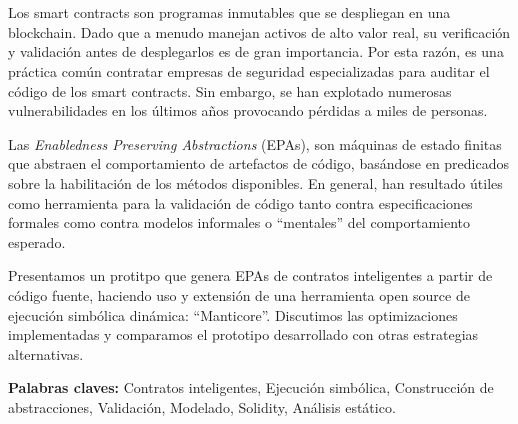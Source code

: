 \chapter*{\runtitulo}

\noindent Los smart contracts son programas inmutables que se despliegan en una blockchain.
Dado que a menudo manejan activos de alto valor real, su verificación y validación antes de desplegarlos es de gran importancia.
Por esta razón, es una práctica común contratar empresas de seguridad especializadas para auditar el código de los smart contracts.
Sin embargo, se han explotado numerosas vulnerabilidades en los últimos años provocando pérdidas a miles de personas.

Las \textit{Enabledness Preserving Abstractions} (EPAs), son máquinas de estado finitas que abstraen el comportamiento de artefactos de código, basándose en predicados sobre la habilitación de los métodos disponibles.
En general, han resultado útiles como herramienta para la validación de código tanto contra especificaciones formales como contra modelos informales o ``mentales'' del comportamiento esperado.

Presentamos un protitpo que genera EPAs de contratos inteligentes a partir de código fuente, haciendo uso y extensión de una herramienta open source de ejecución simbólica dinámica: ``Manticore''.
Discutimos las optimizaciones implementadas y comparamos el prototipo desarrollado con otras estrategias alternativas.

\bigskip

\noindent\textbf{Palabras claves:}  Contratos inteligentes, Ejecución simbólica, Construcción de abstracciones, Validación, Modelado, Solidity, Análisis estático.